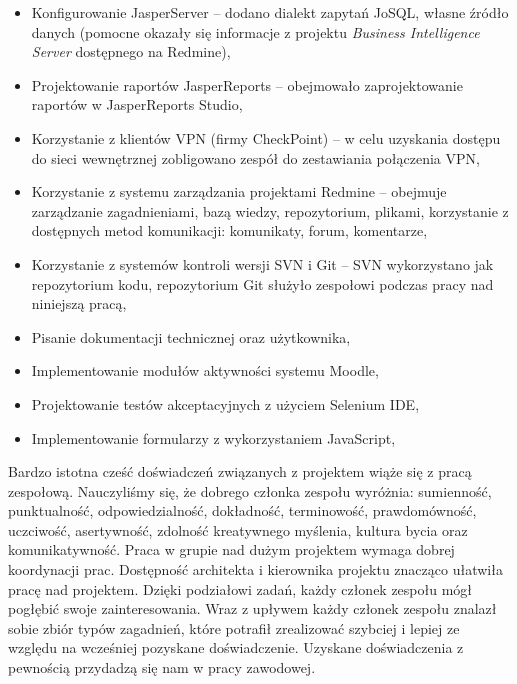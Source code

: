 \begin{itemize}
\item Konfigurowanie JasperServer -- dodano dialekt zapytań JoSQL, własne źródło danych (pomocne okazały się informacje z projektu \emph{Business Intelligence Server} dostępnego na Redmine),
\item Projektowanie raportów JasperReports -- obejmowało zaprojektowanie raportów w JasperReports Studio,
\item Korzystanie z klientów VPN (firmy CheckPoint) -- w celu uzyskania dostępu do sieci wewnętrznej zobligowano zespół do zestawiania połączenia VPN,
\item Korzystanie z systemu zarządzania projektami Redmine -- obejmuje zarządzanie zagadnieniami, bazą wiedzy, repozytorium, plikami, korzystanie z dostępnych metod komunikacji: komunikaty, forum, komentarze,
\item Korzystanie z systemów kontroli wersji SVN i Git -- SVN wykorzystano jak repozytorium kodu, repozytorium Git służyło zespołowi podczas pracy nad niniejszą pracą,
\item Pisanie dokumentacji technicznej oraz użytkownika,
\item Implementowanie modułów aktywności systemu Moodle,
\item Projektowanie testów akceptacyjnych z użyciem Selenium IDE,
\item Implementowanie formularzy z wykorzystaniem JavaScript,
\end{itemize}

Bardzo istotna cześć doświadczeń związanych z projektem wiąże się z pracą zespołową.
Nauczyliśmy się, że dobrego członka zespołu wyróżnia: sumienność, punktualność, odpowiedzialność, dokładność, terminowość, prawdomówność, uczciwość, asertywność, zdolność kreatywnego myślenia, kultura bycia oraz komunikatywność. Praca w grupie nad dużym projektem wymaga dobrej koordynacji prac. Dostępność architekta i kierownika projektu znacząco ułatwiła pracę nad projektem. Dzięki podziałowi zadań, każdy członek zespołu mógł pogłębić swoje zainteresowania. Wraz z upływem każdy członek zespołu znalazł sobie zbiór typów zagadnień, które potrafił zrealizować szybciej i lepiej ze względu na wcześniej pozyskane doświadczenie. Uzyskane doświadczenia z pewnością przydadzą się nam w pracy zawodowej.

